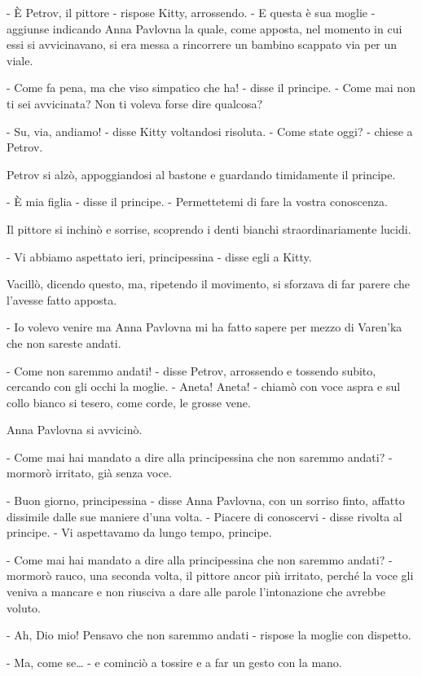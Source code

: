 - È Petrov, il pittore - rispose Kitty, arrossendo. - E questa è sua moglie - aggiunse indicando Anna Pavlovna la quale, come apposta, nel momento in cui essi si avvicinavano, si era messa a rincorrere un bambino scappato via per un viale. 

- Come fa pena, ma che viso simpatico che ha! - disse il principe. - Come mai non ti sei avvicinata? Non ti voleva forse dire qualcosa? 

- Su, via, andiamo! - disse Kitty voltandosi risoluta. - Come state oggi? - chiese a Petrov. 

Petrov si alzò, appoggiandosi al bastone e guardando timidamente il principe. 

- È mia figlia - disse il principe. - Permettetemi di fare la vostra conoscenza. 

Il pittore si inchinò e sorrise, scoprendo i denti bianchi straordinariamente lucidi. 

- Vi abbiamo aspettato ieri, principessina - disse egli a Kitty. 

Vacillò, dicendo questo, ma, ripetendo il movimento, si sforzava di far parere che l'avesse fatto apposta. 

- Io volevo venire ma Anna Pavlovna mi ha fatto sapere per mezzo di Varen'ka che non sareste andati. 

- Come non saremmo andati! - disse Petrov, arrossendo e tossendo subito, cercando con gli occhi la moglie. - Aneta! Aneta! - chiamò con voce aspra e sul collo bianco si tesero, come corde, le grosse vene. 

Anna Pavlovna si avvicinò. 

- Come mai hai mandato a dire alla principessina che non saremmo andati? - mormorò irritato, già senza voce. 

- Buon giorno, principessina - disse Anna Pavlovna, con un sorriso finto, affatto dissimile dalle sue maniere d'una volta. - Piacere di conoscervi - disse rivolta al principe. - Vi aspettavamo da lungo tempo, principe. 

- Come mai hai mandato a dire alla principessina che non saremmo andati? - mormorò rauco, una seconda volta, il pittore ancor più irritato, perché la voce gli veniva a mancare e non riusciva a dare alle parole l'intonazione che avrebbe voluto. 

- Ah, Dio mio! Pensavo che non saremmo andati - rispose la moglie con dispetto. 

- Ma, come se\ldots{} - e cominciò a tossire e a far un gesto con la mano. 

